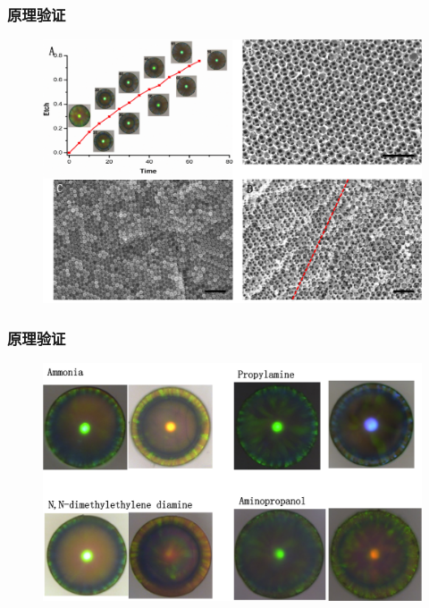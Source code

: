 \documentclass{beamer}
\begin{document}
\begin{frame}
  \frametitle{原理验证}
  \begin{figure}
    \begin{center}
      \includegraphics[width=0.8\linewidth]{figures/ch3/Fig1.png}
    \end{center}
  \end{figure}
\end{frame}

\begin{frame}
  \frametitle{原理验证}
  \begin{figure}
    \begin{center}
      \includegraphics[width=0.8\linewidth]{figures/ch3/FigureS1.png}
    \end{center}
  \end{figure}
\end{frame}
\end{document}
